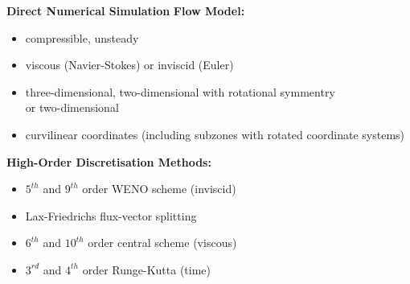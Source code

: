 \documentclass[a0,portrait]{a0poster}
\begin{document}
\vspace*{0.002\textheight}
\Ovalbox
{
  \parbox{\textwidth}{
    \begin{multicols}{3}
    
\textbf{Direct Numerical Simulation}
\newline
\textbf{Flow Model:}
\begin{itemize}
\item compressible, unsteady
\item viscous (Navier-Stokes) or inviscid (Euler)
\item three-dimensional, two-dimensional with rotational symmentry \\ or two-dimensional
\item curvilinear coordinates (including subzones with rotated coordinate systems)
\end{itemize}
\newline
\textbf{High-Order Discretisation Methods:}
\begin{itemize}
\item $5^{th}$ and $9^{th}$ order WENO scheme (inviscid)
\item Lax-Friedrichs flux-vector splitting
\item $6^{th}$ and $10^{th}$ order central scheme (viscous)
\item $3^{rd}$ and $4^{th}$ order Runge-Kutta (time)
\end{itemize}




\end{multicols}}}
\end{document}
